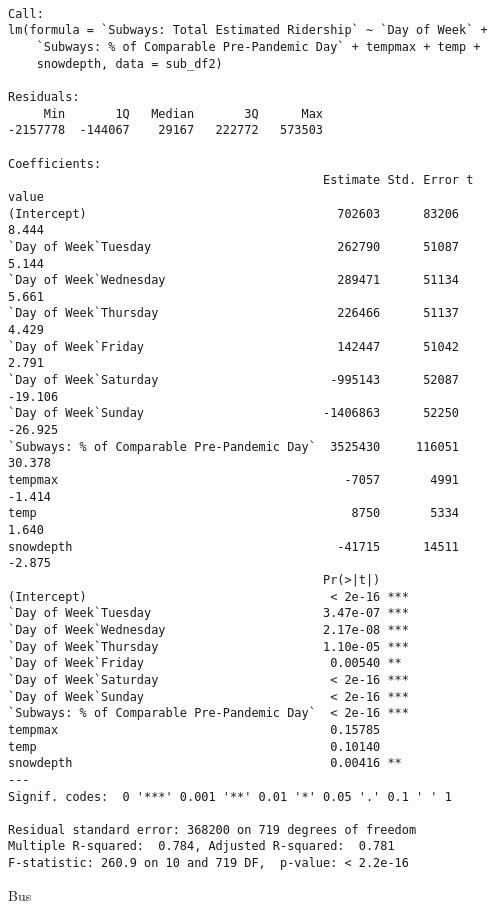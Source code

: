 \documentclass[
  letterpaper,
  DIV=11,
  numbers=noendperiod]{scrartcl}
\begin{document}
\begin{verbatim}

Call:
lm(formula = `Subways: Total Estimated Ridership` ~ `Day of Week` + 
    `Subways: % of Comparable Pre-Pandemic Day` + tempmax + temp + 
    snowdepth, data = sub_df2)

Residuals:
     Min       1Q   Median       3Q      Max 
-2157778  -144067    29167   222772   573503 

Coefficients:
                                            Estimate Std. Error t value
(Intercept)                                   702603      83206   8.444
`Day of Week`Tuesday                          262790      51087   5.144
`Day of Week`Wednesday                        289471      51134   5.661
`Day of Week`Thursday                         226466      51137   4.429
`Day of Week`Friday                           142447      51042   2.791
`Day of Week`Saturday                        -995143      52087 -19.106
`Day of Week`Sunday                         -1406863      52250 -26.925
`Subways: % of Comparable Pre-Pandemic Day`  3525430     116051  30.378
tempmax                                        -7057       4991  -1.414
temp                                            8750       5334   1.640
snowdepth                                     -41715      14511  -2.875
                                            Pr(>|t|)    
(Intercept)                                  < 2e-16 ***
`Day of Week`Tuesday                        3.47e-07 ***
`Day of Week`Wednesday                      2.17e-08 ***
`Day of Week`Thursday                       1.10e-05 ***
`Day of Week`Friday                          0.00540 ** 
`Day of Week`Saturday                        < 2e-16 ***
`Day of Week`Sunday                          < 2e-16 ***
`Subways: % of Comparable Pre-Pandemic Day`  < 2e-16 ***
tempmax                                      0.15785    
temp                                         0.10140    
snowdepth                                    0.00416 ** 
---
Signif. codes:  0 '***' 0.001 '**' 0.01 '*' 0.05 '.' 0.1 ' ' 1

Residual standard error: 368200 on 719 degrees of freedom
Multiple R-squared:  0.784, Adjusted R-squared:  0.781 
F-statistic: 260.9 on 10 and 719 DF,  p-value: < 2.2e-16
\end{verbatim}

Bus
\end{document}
